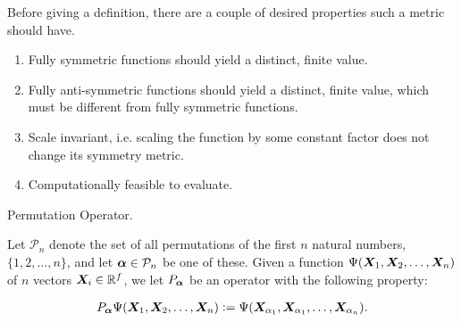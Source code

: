 \documentclass[Thesis.tex]{subfiles}
\begin{document}
Before giving a definition, there are a couple of desired properties such a
metric should have.

\begin{enumerate}
    \item Fully symmetric functions should yield a distinct, finite value.
    \item Fully anti-symmetric functions should yield a distinct, finite value,
        which must be different from fully symmetric functions.
    \item Scale invariant, i.e. scaling the function by
        some constant factor does not change its symmetry metric.
    \item Computationally feasible to evaluate.
\end{enumerate}

\begin{definition}{Permutation Operator.}

     Let $\mathcal{P}_n$ denote the set of all permutations of the first $n$
     natural numbers, $\{1, 2, \dots, n\}$, and let $\bm{\alpha}\in \mathcal{P}_n$
     be one of these. Given a function $\Psi(\bm{X}_1, \bm{X}_2,\dots,\bm{X}_n)$ of
     $n$ vectors $\bm{X}_i\in \mathbb{R}^f$, we let $P_{\bm{\alpha}}$ be an
     operator with the following property:

    \begin{align}
        P_{\bm{\alpha}}\Psi(\bm{X}_1,\bm{X}_2,\dots,\bm{X}_n)
        \vcentcolon=
        \Psi(\bm{X}_{\alpha_1},\bm{X}_{\alpha_1},\dots,\bm{X}_{\alpha_n}).
    \end{align}
\end{definition}
\end{document}
